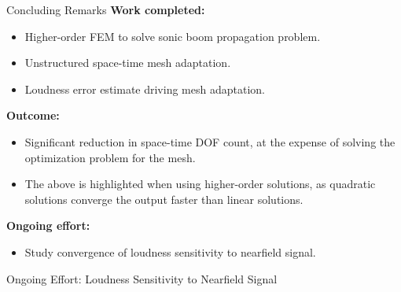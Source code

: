\documentclass{beamer}
\begin{document}
{

\begin{frame}[t]{Concluding Remarks}
  \textbf{Work completed:}
  \begin{itemize}
    \item Higher-order FEM to solve sonic boom propagation problem.
    \item Unstructured space-time mesh adaptation.
    \item Loudness error estimate driving mesh adaptation.
  \end{itemize}

  {
  \textbf{Outcome:}
  \begin{itemize}
      \item Significant reduction in space-time DOF count, at the expense of solving the optimization problem for the mesh.
      \item The above is highlighted when using higher-order solutions, as quadratic solutions converge the output faster than linear solutions.
    \end{itemize}
  }

  {
    \vspace{15pt}
    \textbf{Ongoing effort:}
    \begin{itemize}
      \item Study convergence of loudness sensitivity to nearfield signal.
    \end{itemize}
  }
\end{frame}


\begin{frame}[t]{Ongoing Effort: Loudness Sensitivity to Nearfield Signal}



\end{frame}}
\end{document}
